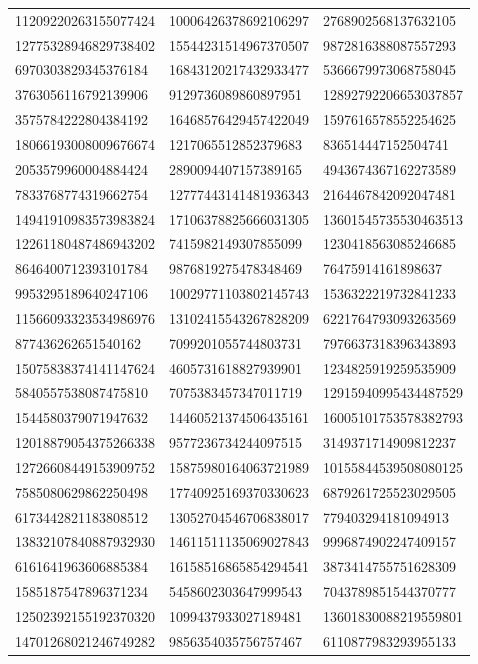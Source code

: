 \begin{longtable}{*{3}{l}}
11209220263155077424&10006426378692106297&2768902568137632105\\
12775328946829738402&15544231514967370507&9872816388087557293\\
6970303829345376184&16843120217432933477&5366679973068758045\\
3763056116792139906&9129736089860897951&12892792206653037857\\
3575784222804384192&16468576429457422049&1597616578552254625\\
18066193008009676674&1217065512852379683&836514447152504741\\
2053579960004884424&2890094407157389165&4943674367162273589\\
7833768774319662754&12777443141481936343&2164467842092047481\\
14941910983573983824&17106378825666031305&13601545735530463513\\
12261180487486943202&7415982149307855099&1230418563085246685\\
8646400712393101784&9876819275478348469&76475914161898637\\
9953295189640247106&10029771103802145743&1536322219732841233\\
11566093323534986976&13102415543267828209&6221764793093263569\\
877436262651540162&7099201055744803731&7976637318396343893\\
15075838374141147624&4605731618827939901&1234825919259535909\\
5840557538087475810&7075383457347011719&12915940995434487529\\
1544580379071947632&14460521374506435161&16005101753578382793\\
12018879054375266338&9577236734244097515&3149371714909812237\\
12726608449153909752&15875980164063721989&10155844539508080125\\
7585080629862250498&17740925169370330623&6879261725523029505\\
6173442821183808512&13052704546706838017&779403294181094913\\
13832107840887932930&14611511135069027843&9996874902247409157\\
6161641963606885384&16158516865854294541&3873414755751628309\\
1585187547896371234&5458602303647999543&7043789851544370777\\
12502392155192370320&1099437933027189481&13601830088219559801\\
14701268021246749282&9856354035756757467&6110877983293955133\\

\end{longtable}
